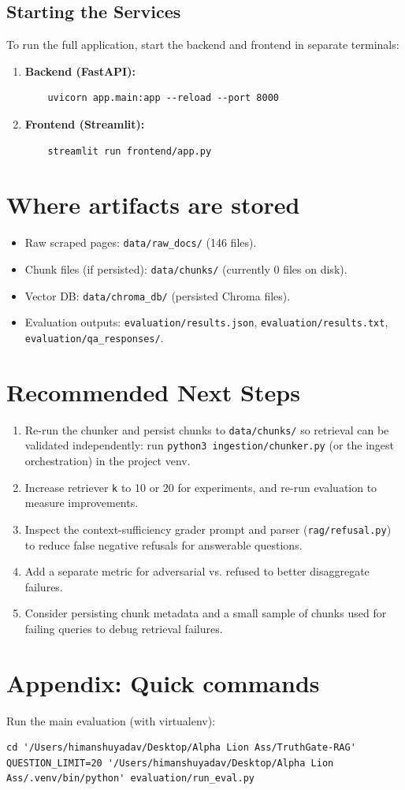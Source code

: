 \documentclass[11pt]{article}
\begin{document}
\subsection{Starting the Services}
To run the full application, start the backend and frontend in separate terminals:
\begin{enumerate}
    \item \textbf{Backend (FastAPI):}
    \begin{verbatim}
    uvicorn app.main:app --reload --port 8000
    \end{verbatim}
    \item \textbf{Frontend (Streamlit):}
    \begin{verbatim}
    streamlit run frontend/app.py
    \end{verbatim}
\end{enumerate}

\section{Where artifacts are stored}
\begin{itemize}
  \item Raw scraped pages: \texttt{data/raw_docs/} (146 files).
  \item Chunk files (if persisted): \texttt{data/chunks/} (currently 0 files on disk).
  \item Vector DB: \texttt{data/chroma_db/} (persisted Chroma files).
  \item Evaluation outputs: \texttt{evaluation/results.json}, \texttt{evaluation/results.txt}, \texttt{evaluation/qa_responses/}.
\end{itemize}

\section{Recommended Next Steps}
\begin{enumerate}
  \item Re-run the chunker and persist chunks to \texttt{data/chunks/} so retrieval can be validated independently: run \texttt{python3 ingestion/chunker.py} (or the ingest orchestration) in the project venv.
  \item Increase retriever \texttt{k} to 10 or 20 for experiments, and re-run evaluation to measure improvements.
  \item Inspect the context-sufficiency grader prompt and parser (\texttt{rag/refusal.py}) to reduce false negative refusals for answerable questions.
  \item Add a separate metric for adversarial vs. refused to better disaggregate failures.
  \item Consider persisting chunk metadata and a small sample of chunks used for failing queries to debug retrieval failures.
\end{enumerate}

\section*{Appendix: Quick commands}
Run the main evaluation (with virtualenv):
\begin{verbatim}
cd '/Users/himanshuyadav/Desktop/Alpha Lion Ass/TruthGate-RAG'
QUESTION_LIMIT=20 '/Users/himanshuyadav/Desktop/Alpha Lion Ass/.venv/bin/python' evaluation/run_eval.py
\end{verbatim}
\end{document}
